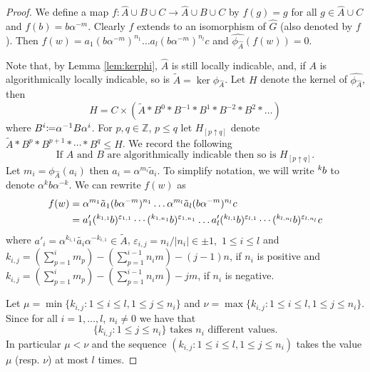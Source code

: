 \documentclass[12pt, a4paper]{amsart}
\theoremstyle{remark}
\theoremstyle{definition}
\begin{document}
\begin{proof}
We define a map $f\colon \widehat{A}\cup B\cup C\to \widehat{A}\cup B\cup C$ by $f(g)=g$ for all $g\in \widehat{A}\cup C$ and $f(b)=b\alpha^{-m}$. Clearly $f$ extends to  an isomorphism of $\widehat{G}$ (also denoted by $f$). Then $f(w)=a_1(b\alpha^{-m})^{n_1}\dots a_l(b\alpha^{-m})^{n_l}c$ and $\widehat{\phi_{\widehat{A}}}(f(w))=0$.

Note that, by Lemma \ref{lem:kerphi}, $\widehat{A}$ is still locally indicable, and, if $A$ is algorithmically locally indicable, so is $\widetilde{A}=\ker \phi_{\widehat{A}}$. Let $H$ denote the kernel of  $\widehat{\phi_{\widehat{A}}}$, then  
$$H=C\times (\widetilde{A}*B^0*B^{-1}*B^{1}*B^{-2}*B^{2}*\dots )$$
where $B^i{\mathrel{\mathop\mathchar"303A}\mkern-1.2mu=} \alpha^{-1}B\alpha^{i}$. For $p,q\in {\mathbb{Z}}$, $p\leq q$ let $H_{[p\uparrow q]}$ denote $\widetilde{A}*B^{p}*B^{p+1}*\cdots *B^{q}\leqslant H$. We record the following
\begin{equation}\label{eq:Hloq}
\text{If $A$ and $B$ are algorithmically indicable then so is $H_{[p\uparrow q]}$.}
\end{equation}
Let $m_i=\phi_{\widehat{A}}(a_i)$ then $a_i=\alpha^{m_i}\tilde{a}_i$. To simplify notation, we will write ${{}^{{k}}\mkern-1mu{b}}$ to denote $\alpha^{k}b\alpha^{-k}$.
We can rewrite $f(w)$ as
\begin{align*}
f(w)&=\alpha^{m_1}\tilde{a}_1(b\alpha^{-m})^{n_1}\dots \alpha^{m_l}\tilde{a}_l(b\alpha^{-m})^{n_l}c\\
 &=a'_1({{}^{{k_{1,1}}}\mkern-1mu{{b}}})^{{\varepsilon}_{1,1}}\cdots ({{}^{{k_{1,n_1}}}\mkern-1mu{{b}}})^{{\varepsilon}_{1,n_1}}
\dots a'_l({{}^{{k_{l,1}}}\mkern-1mu{{b}}})^{{\varepsilon}_{l,1}}\cdots ({{}^{{k_{l,n_l}}}\mkern-1mu{{b}}})^{{\varepsilon}_{l,n_l}}c
\end{align*}
where $a'_i=\alpha^{k_{i,1}}\tilde{a_i}\alpha^{-k_{i,1}}\in \widetilde{A}$, ${\varepsilon}_{i,j}=n_i/|n_i|\in \pm 1,$  $1\leq i\leq l$ and $k_{i,j}=\left(\sum_{p=1}^{i} m_p\right) -\left(\sum_{p=1}^{i-1} n_i m\right)-(j-1)n$, if $n_i$ is positive and $k_{i,j}=\left(\sum_{p=1}^{i} m_p\right) -\left(\sum_{p=1}^{i-1} n_i m\right)-jm$, if $n_i$ is negative.

 Let $\mu=\min \{ k_{i,j} :1\leq i\leq l, 1\leq j\leq n_{i}\}$ and $\nu=\max\{k_{i,j} : 1\leq i\leq l, 1\leq j\leq n_i\}.$  Since for all $i=1,\dots, l$, $n_i\neq 0$ we have that
\begin{equation} \label{eq:k_ivalues}
  \{k_{i,j}: 1\leq j\leq n_i\}\mbox{ takes $n_i$ different values}.
\end{equation}
In particular $\mu<\nu$ and the sequence $(k_{i,j} : 1\leq i\leq l,1\leq j\leq n_i)$ takes the value $\mu$ (resp. $\nu$) at most $l$ times.


\end{proof}
\end{document}
